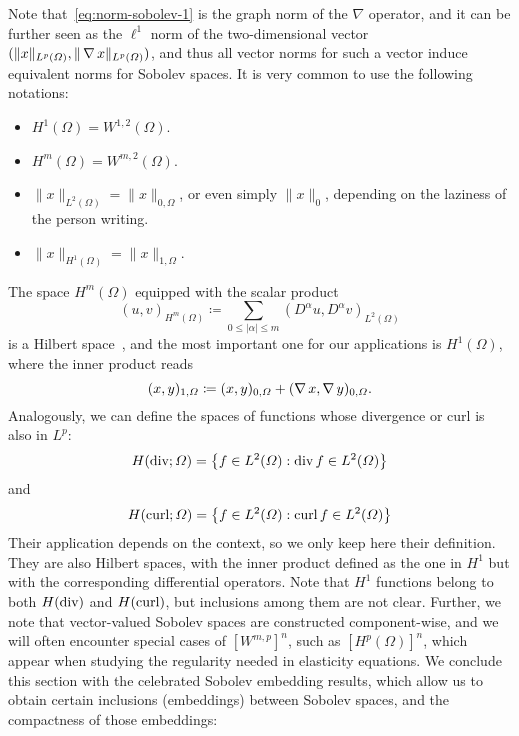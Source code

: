 Note that~\ref{eq:norm-sobolev-1} is the graph norm of the $\nabla$ operator, and it can be further seen as the $\ell^1$ norm of the two-dimensional vector $(\|x\|_{L^p(\Omega)}, \|\operatorname{\nabla} x\|_{L^p(\Omega)})$, and thus all vector norms for such a vector induce equivalent norms for Sobolev spaces. It is very common to use the following notations:   
\begin{itemize}
    \item $H^1(\Omega) = W^{1,2}(\Omega)$.
    \item $H^m(\Omega) = W^{m,2}(\Omega)$.
    \item $\| x \|_{L^2(\Omega)} = \| x \|_{0,\Omega}$, or even simply $ \| x\|_0$, depending on the laziness of the person writing.
    \item $\| x \|_{H^1(\Omega)} = \|x\|_{1,\Omega}$.
\end{itemize}
The space $H^m(\Omega)$ equipped with the scalar product 
\begin{equation}
    (u,v)_{H^m(\Omega)} \coloneqq \sum_{0\leq |\alpha|\leq m}(D^\alpha u, D^\alpha v)_{L^2(\Omega)}
\end{equation}
is a Hilbert space~\cite{BrezisFA}, and the most important one for our applications is $H^1(\Omega)$, where the inner product reads
\begin{equation*}
    (x,y)_{1,\Omega} \coloneqq (x,y)_{0,\Omega} + (\operatorname{\nabla} x, \operatorname{\nabla} y)_{0,\Omega}.
\end{equation*}
Analogously, we can define the spaces of functions whose divergence or curl is also in $L^p$:
\begin{equation}\label{eq:def-hdiv}
    H(\operatorname{\text{div}}; \Omega) = \left\{f\in L^2(\Omega): \operatorname{\text{div}} f \in L^2(\Omega)\right\}
\end{equation}
and    
\begin{equation}\label{eq:def-hcurl}
    H(\operatorname{\text{curl}}; \Omega) = \left\{f\in L^2(\Omega): \operatorname{\text{curl}} f \in L^2(\Omega)\right\}
\end{equation}
Their application depends on the context, so we only keep here their definition. They are also Hilbert spaces, with the inner product defined as the one in $H^1$ but with the corresponding differential operators. Note that $H^1$ functions belong to both $H(\operatorname{\text{div}})$ and $H(\operatorname{\text{curl}})$, but inclusions among them are not clear. Further, we note that vector-valued Sobolev spaces are constructed component-wise, and we will often encounter special cases of $[W^{m,p}]^n$, such as $[H^p(\Omega)]^n$, which appear when studying the regularity needed in elasticity equations. 
We conclude this section with the celebrated Sobolev embedding results, which allow us to obtain certain inclusions (embeddings) between Sobolev spaces, and the compactness of those embeddings: 
